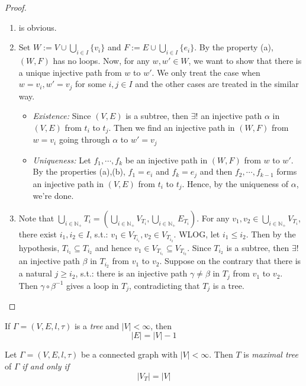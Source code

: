 \begin{proof}
    \begin{enumerate}
        \item is obvious.
        \item Set $W:= V \cup \bigcup_{i \in I} \{v_i\}$ and $F:= E \cup \bigcup_{i \in I} \{e_i\}$. By the property (a), $(W,F)$ has no loops. Now, for any $w,w' \in W$, we want to show that there is a unique injective path from $w$ to $w'$. We only treat the case when $w=v_i,w'=v_j$ for some $i,j\in I$ and the other cases are treated in the similar way.
        \begin{itemize}
            \item \textit{Existence:} Since $(V,E)$ is a subtree, then $\exists!$ an injective path $\alpha$ in $(V,E)$ from $t_i$ to $t_j$. Then we find an injective path in $(W,F)$ from $w=v_i$ going through $\alpha$ to $w'= v_j$
            \item \textit{Uniqueness:} Let $f_1,\cdots, f_k$ be an injective path in $(W,F)$ from $w$ to $w'$. By the properties (a),(b), $f_1=e_i$ and $f_k=e_j$ and then $f_2,\cdots,f_{k-1}$ forms an injective path in $(V,E)$ from $t_i$ to $t_j$. Hence, by the uniqueness of $\alpha$, we're done.
        \end{itemize}

        \item Note that $\bigcup_{i \in \mathbb{N}_+} T_i = (\bigcup_{i \in \mathbb{N}_+}V_{T_i}, \bigcup_{i \in \mathbb{N}_+} E_{T_i})$. For any $v_1,v_2 \in \bigcup_{i \in \mathbb{N}_+} V_{T_i}$, there exist $i_1,i_2\in I$, s.t.: $v_1 \in V_{T_{i_1}}, v_2 \in V_{T_{i_2}}$. WLOG, let $i_1 \leq i_2$. Then by the hypothesis, $T_{i_1} \subseteq T_{i_2}$ and hence $v_1 \in V_{T_{i_1}} \subseteq V_{T_{i_2}}$. Since $T_{i_2}$ is a subtree, then $\exists!$ an injective path $\beta$ in $T_{i_2}$ from $v_1$ to $v_2$. Suppose on the contrary that there is a natural $j \geq i_2$, s.t.: there is an injective path $\gamma \neq \beta$ in $T_j$ from $v_1$ to $v_2$. Then $\gamma \circ \beta^{-1}$ gives a loop in $T_j$, contradicting that $T_j$ is a tree.
    \end{enumerate}
\end{proof}

\begin{proposition}
    If $\Gamma = (V,E,l,\tau)$ is a \textit{tree} and $|V| < \infty$, then
    $$|E| = |V| -1$$
\end{proposition}

\begin{theorem}
    Let $\Gamma = (V,E,l,\tau)$ be a connected graph with $|V|< \infty$. Then $T$ is \textit{maximal tree} of $\Gamma$ \textit{if and only if}
    $$|V_T| = |V|$$
\end{theorem}

